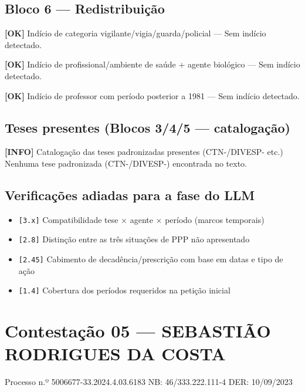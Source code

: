 \documentclass[12pt,a4paper]{article}
\newcommand{\statusOK}[1]{\textcolor{corOK}{\textbf{[OK]}} #1}
\newcommand{\statusINFO}[1]{\textcolor{corINFO}{\textbf{[INFO]}} #1}
\begin{document}
\subsection{Bloco 6 --- Redistribuição}

\statusOK{Indício de categoria vigilante/vigia/guarda/policial} --- Sem indício detectado.

\medskip
\statusOK{Indício de profissional/ambiente de saúde + agente biológico} --- Sem indício detectado.

\medskip
\statusOK{Indício de professor com período posterior a 1981} --- Sem indício detectado.

\subsection{Teses presentes (Blocos 3/4/5 --- catalogação)}

\statusINFO{Catalogação das teses padronizadas presentes (CTN-/DIVESP- etc.)}\\
Nenhuma tese padronizada (CTN-/DIVESP-) encontrada no texto.

\subsection{Verificações adiadas para a fase do LLM}

\begin{itemize}
  \item \texttt{[3.x]} Compatibilidade tese × agente × período (marcos temporais)
  \item \texttt{[2.8]} Distinção entre as três situações de PPP não apresentado
  \item \texttt{[2.45]} Cabimento de decadência/prescrição com base em datas e tipo de ação
  \item \texttt{[1.4]} Cobertura dos períodos requeridos na petição inicial
\end{itemize}



\clearpage
{}
\section{Contestação 05 --- SEBASTIÃO RODRIGUES DA COSTA}
\begin{center}
  {\small Processo n.º 5006677-33.2024.4.03.6183 \quad NB: 46/333.222.111-4 \quad DER: 10/09/2023}
\end{center}
\end{document}
